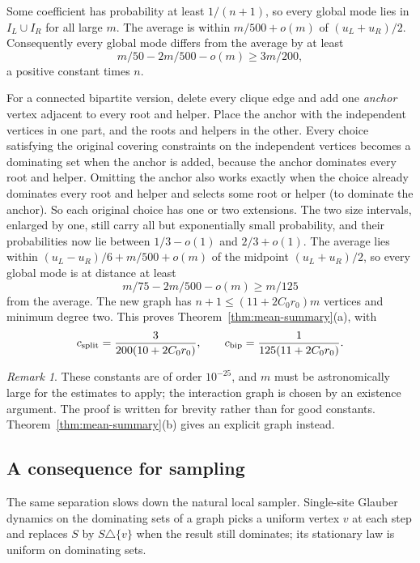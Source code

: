 \documentclass[11pt,a4paper]{article}
\theoremstyle{definition}
\theoremstyle{remark}
\newtheorem{remark}[theorem]{Remark}
\begin{document}
Some coefficient has probability at least $1/(n+1)$, so every global mode lies in $I_L\cup I_R$ for all large $m$. The average is within $m/500+o(m)$ of $(u_L+u_R)/2$. Consequently every global mode differs from the average by at least
\[
m/50-2m/500-o(m)\ge3m/200,
\]
a positive constant times $n$.

For a connected bipartite version, delete every clique edge and add one \emph{anchor} vertex adjacent to every root and helper. Place the anchor with the independent vertices in one part, and the roots and helpers in the other. Every choice satisfying the original covering constraints on the independent vertices becomes a dominating set when the anchor is added, because the anchor dominates every root and helper. Omitting the anchor also works exactly when the choice already dominates every root and helper and selects some root or helper (to dominate the anchor). So each original choice has one or two extensions. The two size intervals, enlarged by one, still carry all but exponentially small probability, and their probabilities now lie between $1/3-o(1)$ and $2/3+o(1)$. The average lies within $(u_L-u_R)/6+m/500+o(m)$ of the midpoint $(u_L+u_R)/2$, so every global mode is at distance at least
\[
m/75-2m/500-o(m)\ge m/125
\]
from the average. The new graph has $n+1\le(11+2C_0r_0)m$ vertices and minimum degree two. This proves Theorem~\ref{thm:mean-summary}(a), with
\[
c_{\rm split}=\frac{3}{200(10+2C_0r_0)},\qquad
c_{\rm bip}=\frac{1}{125(11+2C_0r_0)}.
\]

\begin{remark}\label{rem:constants}
These constants are of order $10^{-25}$, and $m$ must be astronomically large for the estimates to apply; the interaction graph is chosen by an existence argument. The proof is written for brevity rather than for good constants. Theorem~\ref{thm:mean-summary}(b) gives an explicit graph instead.
\end{remark}

\subsection{A consequence for sampling}
The same separation slows down the natural local sampler. Single-site Glauber dynamics on the dominating sets of a graph picks a uniform vertex $v$ at each step and replaces $S$ by $S\triangle\{v\}$ when the result still dominates; its stationary law is uniform on dominating sets.
\end{document}
